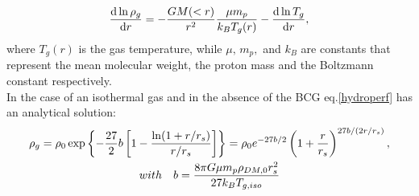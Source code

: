 \documentclass{article}
\begin{document}
\begin{equation}\label{hydroperf}
	\derivative{\ln \rho_{g}}{r}=-\frac{GM(<r)}{r^{2}}\frac{\mu m_{p}}{k_{B}T_{g}(r)}-\derivative{\ln T_{g}}{r},
\end{equation}
where $T_{g}(r)$ is the gas temperature, while $\mu ,\, m_{p},$ and $k_{B}$ are constants that represent the mean molecular weight, the proton mass and the Boltzmann constant respectively.\\
In the case of an isothermal gas and in the absence of the BCG eq.\eqref{hydroperf} has an analytical solution:
	\begin{gather}\label{isogas}
		\rho_{g}=\rho_{0}\exp\left\{-\frac{27}{2}b\left[1-\frac{\ln (1+r/r_{s})}{r/r_{s}}\right]\right\}=\rho_{0}e^{-27b/2}\left(1+\frac{r}{r_{s}}\right)^{27b/(2r/r_{s})},\\
	with \quad b=\frac{8\pi G\mu m_{p}\rho_{DM,0}r_{s}^{2}}{27k_{B}T_{g,iso}}\notag
	\end{gather}
\end{document}
